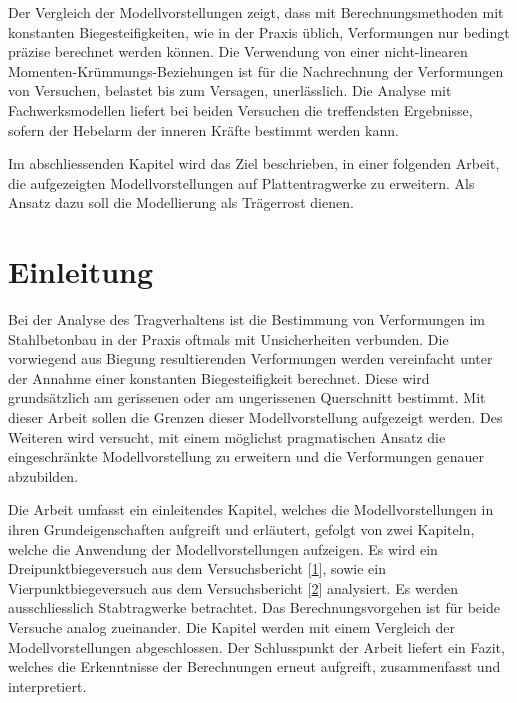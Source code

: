 \documentclass[
  12pt,
  letterpaper,
  egregdoesnotlikesansseriftitles]{scrreprt}
\renewcommand*\contentsname{Inhaltsverzeichnis}
\newcommand\contentsname{Inhaltsverzeichnis}
\begin{document}
Der Vergleich der Modellvorstellungen zeigt, dass mit Berechnungsmethoden mit konstanten Biegesteifigkeiten, wie in der Praxis üblich, Verformungen nur bedingt präzise berechnet werden können. Die Verwendung von einer nicht-linearen Momenten-Krümmungs-Beziehungen ist für die Nachrechnung der Verformungen von Versuchen, belastet bis zum Versagen, unerlässlich. Die Analyse mit Fachwerksmodellen liefert bei beiden Versuchen die treffendsten Ergebnisse, sofern der Hebelarm der inneren Kräfte bestimmt werden kann. 


Im abschliessenden Kapitel wird das Ziel beschrieben, in einer folgenden Arbeit, die aufgezeigten Modellvorstellungen auf Plattentragwerke zu erweitern. Als Ansatz dazu soll die Modellierung als Trägerrost dienen.

\ifdefined\Shaded\renewenvironment{Shaded}{\begin{tcolorbox}[interior hidden, enhanced, breakable, sharp corners, borderline west={3pt}{0pt}{shadecolor}, boxrule=0pt, frame hidden]}{\end{tcolorbox}}\fi

\renewcommand*\contentsname{Inhaltsverzeichnis}
{
\hypersetup{linkcolor=}
\setcounter{tocdepth}{1}
\tableofcontents
}
\listoffigures
\listoftables
{}

\hypertarget{einleitung}{%
\chapter{Einleitung}\label{einleitung}}

Bei der Analyse des Tragverhaltens ist die Bestimmung von Verformungen
im Stahlbetonbau in der Praxis oftmals mit Unsicherheiten verbunden. Die
vorwiegend aus Biegung resultierenden Verformungen werden vereinfacht
unter der Annahme einer konstanten Biegesteifigkeit berechnet. Diese
wird grundsätzlich am gerissenen oder am ungerissenen Querschnitt
bestimmt. Mit dieser Arbeit sollen die Grenzen dieser Modellvorstellung
aufgezeigt werden. Des Weiteren wird versucht, mit einem möglichst
pragmatischen Ansatz die eingeschränkte Modellvorstellung zu erweitern
und die Verformungen genauer abzubilden.

Die Arbeit umfasst ein einleitendes Kapitel, welches die
Modellvorstellungen in ihren Grundeigenschaften aufgreift und erläutert,
gefolgt von zwei Kapiteln, welche die Anwendung der Modellvorstellungen
aufzeigen. Es wird ein Dreipunktbiegeversuch aus dem Versuchsbericht
{[}\protect\hyperlink{ref-Jaeger2006}{1}{]}, sowie ein
Vierpunktbiegeversuch aus dem Versuchsbericht
{[}\protect\hyperlink{ref-Tue2019}{2}{]} analysiert. Es werden
ausschliesslich Stabtragwerke betrachtet. Das Berechnungsvorgehen ist
für beide Versuche analog zueinander. Die Kapitel werden mit einem
Vergleich der Modellvorstellungen abgeschlossen. Der Schlusspunkt der
Arbeit liefert ein Fazit, welches die Erkenntnisse der Berechnungen
erneut aufgreift, zusammenfasst und interpretiert.
\end{document}
